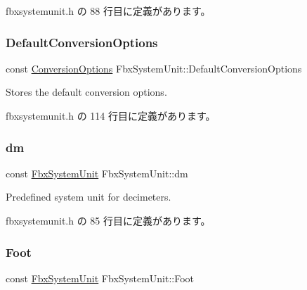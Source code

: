  fbxsystemunit.\+h の 88 行目に定義があります。

\mbox{\label{class_fbx_system_unit_ae76376923416767b2a5f6a7e4e663064}} 
\subsubsection{\texorpdfstring{Default\+Conversion\+Options}{DefaultConversionOptions}}
{\footnotesize\ttfamily const \hyperlink{struct_fbx_system_unit_1_1_conversion_options}{Conversion\+Options} Fbx\+System\+Unit\+::\+Default\+Conversion\+Options\hspace{0.3cm}{\ttfamily [static]}}



Stores the default conversion options. 



 fbxsystemunit.\+h の 114 行目に定義があります。

\mbox{\label{class_fbx_system_unit_a8448652c675044fb54506a4044f72814}} 
\subsubsection{\texorpdfstring{dm}{dm}}
{\footnotesize\ttfamily const \hyperlink{class_fbx_system_unit}{Fbx\+System\+Unit} Fbx\+System\+Unit\+::dm\hspace{0.3cm}{\ttfamily [static]}}



Predefined system unit for decimeters. 



 fbxsystemunit.\+h の 85 行目に定義があります。

\mbox{\label{class_fbx_system_unit_a94d3bfe1b4fd69a021bbaff3a61a90d5}} 
\subsubsection{\texorpdfstring{Foot}{Foot}}
{\footnotesize\ttfamily const \hyperlink{class_fbx_system_unit}{Fbx\+System\+Unit} Fbx\+System\+Unit\+::\+Foot\hspace{0.3cm}{\ttfamily [static]}}



